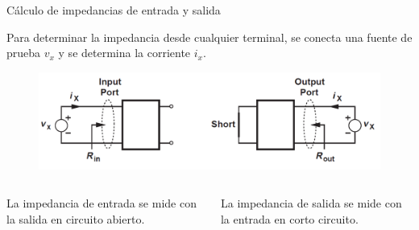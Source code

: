 \documentclass[t,aspectratio=169]{beamer}
\begin{document}
\begin{frame}{Cálculo de impedancias de entrada y salida}

Para determinar la impedancia desde cualquier terminal, se conecta una fuente de prueba $v_x$ y se determina la corriente $i_x$.

\begin{figure}
    \centering
    \includegraphics[width=\textwidth]{figuras/amplificador_impedancias_2.png}
\end{figure}

\begin{columns}
\begin{column}{0.5\textwidth}
\centering
La impedancia de entrada se mide con la salida en circuito abierto.
\end{column}
\begin{column}{0.5\textwidth}
\centering
La impedancia de salida se mide con la entrada en corto circuito.
\end{column}
\end{columns}
    
\end{frame}
\end{document}
